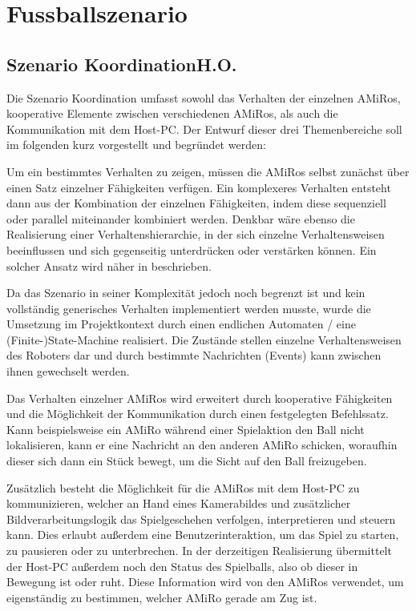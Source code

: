 \chapter{Fussballszenario} \label{kap:Fussballszenario} %

\section[Szenario Koordination]{Szenario Koordination\hfill {\normalsize H.O.}}

Die Szenario Koordination umfasst sowohl das Verhalten der einzelnen AMiRos, kooperative Elemente zwischen verschiedenen AMiRos, als auch die Kommunikation mit dem Host-PC. Der Entwurf dieser drei Themenbereiche soll im folgenden kurz vorgestellt und begründet werden:

Um ein bestimmtes Verhalten zu zeigen, müssen die AMiRos selbst zunächst über einen Satz einzelner Fähigkeiten verfügen. Ein komplexeres Verhalten entsteht dann aus der Kombination der einzelnen Fähigkeiten, indem diese sequenziell oder parallel miteinander kombiniert werden. Denkbar wäre ebenso die Realisierung einer Verhaltenshierarchie, in der sich einzelne Verhaltensweisen beeinflussen und sich gegenseitig unterdrücken oder verstärken können. Ein solcher Ansatz wird näher in \cite{Brooks:1986} beschrieben.

Da das Szenario in seiner Komplexität jedoch noch begrenzt ist und kein vollständig generisches Verhalten implementiert werden musste, wurde die Umsetzung im Projektkontext durch einen endlichen Automaten / eine (Finite-)State-Machine realisiert. Die Zustände stellen einzelne Verhaltensweisen des Roboters dar und durch bestimmte Nachrichten (Events) kann zwischen ihnen gewechselt werden.

Das Verhalten einzelner AMiRos wird erweitert durch kooperative Fähigkeiten und die Möglichkeit der Kommunikation durch einen festgelegten Befehlssatz. Kann beispielsweise ein AMiRo während einer Spielaktion den Ball nicht lokalisieren, kann er eine Nachricht an den anderen AMiRo schicken, woraufhin dieser sich dann ein Stück bewegt, um die Sicht auf den Ball freizugeben.

Zusätzlich besteht die Möglichkeit für die AMiRos mit dem Host-PC zu kommunizieren, welcher an Hand eines Kamerabildes und zusätzlicher Bildverarbeitungslogik das Spielgeschehen verfolgen, interpretieren und steuern kann. Dies erlaubt außerdem eine Benutzerinteraktion, um das Spiel zu starten, zu pausieren oder zu unterbrechen. In der derzeitigen Realisierung übermittelt der Host-PC außerdem noch den Status des Spielballs, also ob dieser in Bewegung ist oder ruht. Diese Information wird von den AMiRos verwendet, um eigenständig zu bestimmen, welcher AMiRo gerade am Zug ist.

